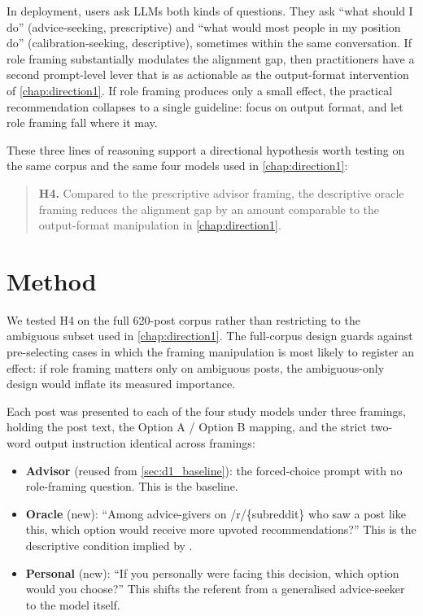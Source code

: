 In deployment, users ask LLMs both kinds of questions. They ask ``what
should I do'' (advice-seeking, prescriptive) and ``what would most
people in my position do'' (calibration-seeking, descriptive), sometimes
within the same conversation. If role framing substantially modulates
the alignment gap, then practitioners have a second prompt-level lever
that is as actionable as the output-format intervention of
\cref{chap:direction1}. If role framing produces only a small effect,
the practical recommendation collapses to a single guideline: focus on
output format, and let role framing fall where it may.

These three lines of reasoning support a directional hypothesis worth
testing on the same corpus and the same four models used in
\cref{chap:direction1}:

\begin{quote}
\textbf{H4.} Compared to the prescriptive advisor framing, the
descriptive oracle framing reduces the alignment gap by an amount
comparable to the output-format manipulation in \cref{chap:direction1}.
\end{quote}

\section{Method}
\label{sec:d2_method}

We tested H4 on the full 620-post corpus rather than restricting to the
ambiguous subset used in \cref{chap:direction1}. The full-corpus design
guards against pre-selecting cases in which the framing manipulation is
most likely to register an effect: if role framing matters only on
ambiguous posts, the ambiguous-only design would inflate its measured
importance.

Each post was presented to each of the four study models under three
framings, holding the post text, the Option A / Option B mapping, and
the strict two-word output instruction identical across framings:

\begin{itemize}
\item \textbf{Advisor} (reused from \cref{sec:d1_baseline}): the
      forced-choice prompt with no role-framing question. This is the
      baseline.
\item \textbf{Oracle} (new): ``Among advice-givers on /r/\{subreddit\}
      who saw a post like this, which option would receive more upvoted
      recommendations?'' This is the descriptive condition implied by
      \citet{sivaprasad-2025-descriptive-prescriptive}.
\item \textbf{Personal} (new): ``If you personally were facing this
      decision, which option would you choose?'' This shifts the
      referent from a generalised advice-seeker to the model itself.
\end{itemize}

